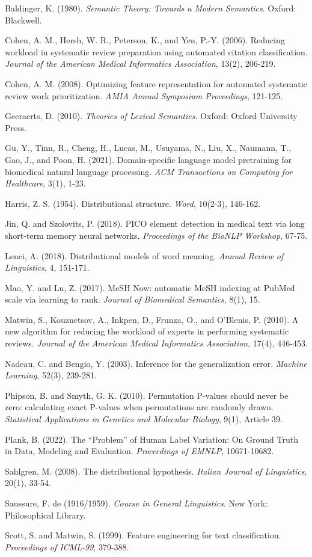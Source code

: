 \documentclass[11pt,a4paper]{article}
\begin{document}
{\small
\noindent Baldinger, K. (1980). \textit{Semantic Theory: Towards a Modern Semantics}. Oxford: Blackwell.

\noindent Cohen, A. M., Hersh, W. R., Peterson, K., and Yen, P.-Y. (2006). Reducing workload in systematic review preparation using automated citation classification. \textit{Journal of the American Medical Informatics Association}, 13(2), 206-219.

\noindent Cohen, A. M. (2008). Optimizing feature representation for automated systematic review work prioritization. \textit{AMIA Annual Symposium Proceedings}, 121-125.

\noindent Geeraerts, D. (2010). \textit{Theories of Lexical Semantics}. Oxford: Oxford University Press.

\noindent Gu, Y., Tinn, R., Cheng, H., Lucas, M., Usuyama, N., Liu, X., Naumann, T., Gao, J., and Poon, H. (2021). Domain-specific language model pretraining for biomedical natural language processing. \textit{ACM Transactions on Computing for Healthcare}, 3(1), 1-23.

\noindent Harris, Z. S. (1954). Distributional structure. \textit{Word}, 10(2-3), 146-162.

\noindent Jin, Q. and Szolovits, P. (2018). PICO element detection in medical text via long short-term memory neural networks. \textit{Proceedings of the BioNLP Workshop}, 67-75.

\noindent Lenci, A. (2018). Distributional models of word meaning. \textit{Annual Review of Linguistics}, 4, 151-171.

\noindent Mao, Y. and Lu, Z. (2017). MeSH Now: automatic MeSH indexing at PubMed scale via learning to rank. \textit{Journal of Biomedical Semantics}, 8(1), 15.

\noindent Matwin, S., Kouznetsov, A., Inkpen, D., Frunza, O., and O'Blenis, P. (2010). A new algorithm for reducing the workload of experts in performing systematic reviews. \textit{Journal of the American Medical Informatics Association}, 17(4), 446-453.

\noindent Nadeau, C. and Bengio, Y. (2003). Inference for the generalization error. \textit{Machine Learning}, 52(3), 239-281.

\noindent Phipson, B. and Smyth, G. K. (2010). Permutation P-values should never be zero: calculating exact P-values when permutations are randomly drawn. \textit{Statistical Applications in Genetics and Molecular Biology}, 9(1), Article 39.

\noindent Plank, B. (2022). The ``Problem'' of Human Label Variation: On Ground Truth in Data, Modeling and Evaluation. \textit{Proceedings of EMNLP}, 10671-10682.

\noindent Sahlgren, M. (2008). The distributional hypothesis. \textit{Italian Journal of Linguistics}, 20(1), 33-54.

\noindent Saussure, F. de (1916/1959). \textit{Course in General Linguistics}. New York: Philosophical Library.

\noindent Scott, S. and Matwin, S. (1999). Feature engineering for text classification. \textit{Proceedings of ICML-99}, 379-388.
}
\end{document}
